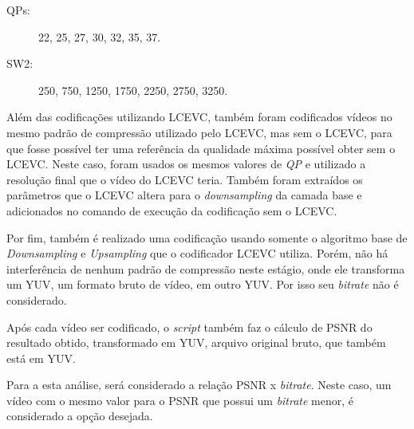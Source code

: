 \begin{description}
\item[QPs:] 22, 25, 27, 30, 32, 35, 37.
\item[SW2:] 250, 750, 1250, 1750, 2250, 2750, 3250.
\end{description}

Além das codificações utilizando \acrshort{LCEVC}, também foram codificados vídeos no mesmo
padrão de compressão utilizado pelo \acrshort{LCEVC}, mas sem o \acrshort{LCEVC}, para que fosse possível 
ter uma referência da qualidade máxima possível obter sem o \acrshort{LCEVC}. Neste caso, foram usados
os mesmos valores de \textit{QP} e utilizado a resolução final que o vídeo do \acrshort{LCEVC} teria.
Também foram extraídos os parâmetros que o LCEVC altera para o \textit{downsampling} da camada
base e adicionados no comando de execução da codificação sem o \acrshort{LCEVC}.
 
Por fim, também é realizado uma codificação usando somente o algoritmo base de \textit{Downsampling}
e \textit{Upsampling} que o codificador \acrshort{LCEVC} utiliza. Porém, não há interferência de nenhum padrão
de compressão neste estágio, onde ele transforma um YUV, um formato bruto de vídeo, em outro YUV. Por isso
seu \textit{bitrate} não é considerado.

Após cada vídeo ser codificado, o \textit{script} também faz o cálculo de \acrfull{PSNR} do resultado obtido,
transformado em YUV, arquivo original bruto, que também está em YUV.

Para a esta análise, será considerado a relação \acrshort{PSNR} x \textit{bitrate}. Neste caso, um vídeo com o mesmo valor
para o \acrshort{PSNR} que possui um \textit{bitrate} menor, é considerado a opção desejada.